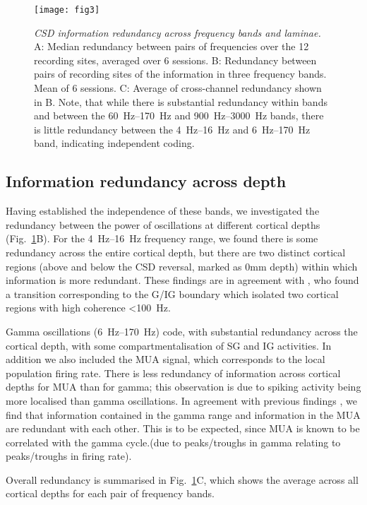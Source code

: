 \begin{figure}[htbp]
\centering \texttt{[image: fig3]}
%
\caption{%
\textit{\ac{CSD} information redundancy across frequency bands and laminae.}
A: Median redundancy between pairs of frequencies over the 12 recording 
sites, averaged over 6 sessions.
B: Redundancy between pairs of recording sites of the information in three 
frequency bands.
Mean of 6 sessions.
C: Average of cross-channel redundancy shown in B.
Note, that while there is substantial redundancy within bands and between the 
\SIrange{60}{170}{Hz} and \SIrange{900}{3000}{Hz} bands, there is little redundancy between the \SIrange{4}{16}{Hz} and
\SIrange{6}{170}{Hz} band, indicating independent coding.}%
\label{fig:lam_3}
%
\end{figure}

\subsection{Information redundancy across depth}
Having established the independence of these bands, we investigated the redundancy between the power of oscillations at different cortical depths (Fig.~\ref{fig:lam_3}B).
For the \SIrange{4}{16}{Hz} frequency range, we found there is some redundancy across the entire cortical depth, but there are two distinct cortical regions (above and below the \ac{CSD} reversal, marked as 0mm depth) within which information is more redundant.
These findings are in agreement with \citep{Maier2010}, who found a transition corresponding to the \ac{G}/\ac{IG} boundary which isolated two cortical regions with high coherence \SI{<100}{Hz}.

Gamma oscillations (\SIrange{6}{170}{Hz}) code, with substantial redundancy across the cortical depth, with some compartmentalisation of \ac{SG} and \ac{IG} activities.
In addition we also included the \ac{MUA} signal, which corresponds to the local population firing rate.
There is less redundancy of information across cortical depths for \ac{MUA} than for gamma; this observation is due to spiking activity being more localised than gamma oscillations.
In agreement with previous findings \citep{Belitski2008}, we find that information contained in the gamma range and information in the \ac{MUA} are redundant with each other.
This is to be expected, since \ac{MUA} is known to be correlated with the gamma cycle.(due to peaks/troughs in gamma relating to peaks/troughs in firing rate).

Overall redundancy is summarised in Fig.~\ref{fig:lam_3}C, which shows the average across all cortical depths for each pair of frequency bands.

